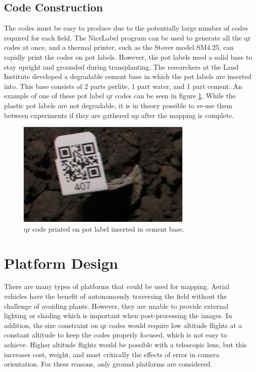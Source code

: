 \subsection{Code Construction}

The codes must be easy to produce due to the potentially large number of codes required for each field.  The NiceLabel program can be used to generate all the \ac{qr} codes at once, and a thermal printer, such as the Stover model SM4.25, can rapidly print the codes on pot labels.  However, the pot labels need a solid base to stay upright and grounded during transplanting. The researchers at the Land Institute developed a degradable cement base in which the pot labels are inserted into.  This base consists of 2 parts perlite, 1 part water, and 1 part cement.  An example of one of these pot label \ac{qr} codes can be seen in figure \ref{QR_code}.  While the plastic pot labels are not degradable, it is in theory possible to re-use them between experiments if they are gathered up after the mapping is complete.

\begin{figure}
	\centering
    \includegraphics[height=2in]{figures/qr_code_407.jpg}
    \caption[Pot label QR code]{\ac{qr} code printed on pot label inserted in cement base.}
    \label{QR_code}
\end{figure}

\section{Platform Design}
\label{section:platform_design}

There are many types of platforms that could be used for mapping.  Aerial vehicles have the benefit of autonomously traversing the field without the challenge of avoiding plants. However, they are unable to provide external lighting or shading which is important when post-processing the images. In addition, the size constraint on \ac{qr} codes would require low altitude flights at a constant altitude to keep the codes properly focused, which is not easy to achieve.  Higher altitude flights would be possible with a telescopic lens, but this increases cost, weight, and most critically the effects of error in camera orientation.  For these reasons, only ground platforms are considered.

